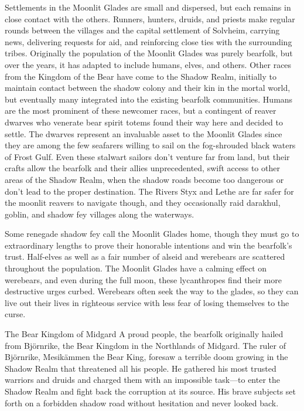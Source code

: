 \documentclass[10pt,a4paper,twoside,bg=print,twocolumn,openany,nodeprecatedcode]{dndbook}
\begin{document}
Settlements in the Moonlit Glades are small and dispersed, but each remains in close contact with the others. Runners, hunters, druids, and priests make regular rounds between the villages and the capital settlement of Solvheim, carrying news, delivering requests for aid, and reinforcing close ties with the surrounding tribes. Originally the population of the Moonlit Glades was purely bearfolk, but over the years, it has adapted to include humans, elves, and others. Other races from the Kingdom of the Bear have come to the Shadow Realm, initially to maintain contact between the shadow colony and their kin in the mortal world, but eventually many integrated into the existing bearfolk communities. Humans are the most prominent of these newcomer races, but a contingent of reaver dwarves who venerate bear spirit totems found their way here and decided to settle. The dwarves represent an invaluable asset to the Moonlit Glades since they are among the few seafarers willing to sail on the fog-shrouded black waters of Frost Gulf. Even these stalwart sailors don't venture far from land, but their crafts allow the bearfolk and their allies unprecedented, swift access to other areas of the Shadow Realm, when the shadow roads become too dangerous or don't lead to the proper destination. The Rivers Styx and Lethe are far safer for the moonlit reavers to navigate though, and they occasionally raid darakhul, goblin, and shadow fey villages along the waterways.

Some renegade shadow fey call the Moonlit Glades home, though they must go to extraordinary lengths to prove their honorable intentions and win the bearfolk's trust. Half-elves as well as a fair number of alseid and werebears are scattered throughout the population. The Moonlit Glades have a calming effect on werebears, and even during the full moon, these lycanthropes find their more destructive urges curbed. Werebears often seek the way to the glades, so they can live out their lives in righteous service with less fear of losing themselves to the curse.

\begin{DndSidebar}[float=!b]{The Bear Kingdom of Midgard}
A proud people, the bearfolk originally hailed from Björnrike, the Bear Kingdom in the Northlands of Midgard. The ruler of Björnrike, Mesikämmen the Bear King, foresaw a terrible doom growing in the Shadow Realm that threatened all his people. He gathered his most trusted warriors and druids and charged them with an impossible task—to enter the Shadow Realm and fight back the corruption at its source. His brave subjects set forth on a forbidden shadow road without hesitation and never looked back.



\end{DndSidebar}
\end{document}
